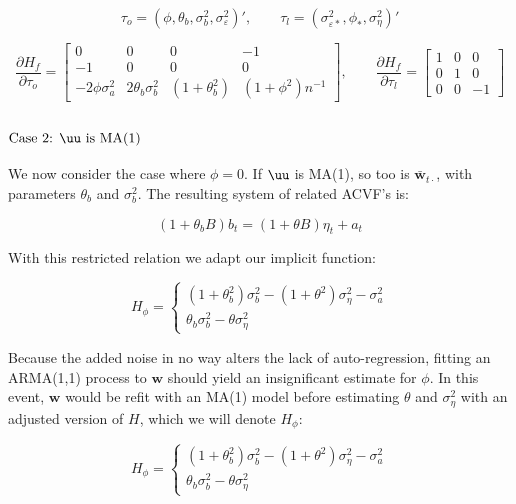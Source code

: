 $$ \tau_o = (\phi,\theta_b,\sigma_b^2, \sigma_\varepsilon^2)', \qquad \tau_l = (\sigma_{\varepsilon*}^2, \phi_*, \sigma_\eta^2)' $$

$$ \frac{\partial H_f}{\partial \tau_o} = \left[\begin{array}{cccc}
    0 & 0 & 0 & -1 \\
    -1 & 0 & 0 & 0 \\
    -2\phi\sigma_a^2 & 2\theta_b\sigma_b^2 & (1 + \theta_b^2) & (1 + \phi^2)n^{-1}
\end{array}\right], \qquad \frac{\partial H_f}{\partial \tau_l} = \left[\begin{array}{ccc}
    1 & 0 & 0  \\
    0 & 1 & 0 \\
    0 & 0 & -1
\end{array}\right] $$

\subsubsection{$\text{Case 2: } \uu \text{ is MA(1)}$}
We now consider the case where $\phi = 0$. If $\uu$ is MA(1), so too is $\bar{\mathbf{w}}_{t\cdot}$, with parameters $\theta_b$ and $\sigma_b^2$. The resulting system of related ACVF's is: 

$$ (1 + \theta_bB)b_t = (1 + \theta B)\eta_t + a_t $$

With this restricted relation we adapt our implicit function:

$$H_\phi = \begin{cases}
    (1 + \theta_b^2)\sigma_b^2 - (1 + \theta^2)\sigma_\eta^2 - \sigma_a^2 \\
    \theta_b\sigma_b^2 - \theta\sigma_\eta^2
\end{cases}$$

Because the added noise in no way alters the lack of auto-regression, fitting an ARMA(1,1) process to $\mathbf{w}$ should yield an insignificant estimate for $\phi$. In this event, $\mathbf{w}$ would be refit with an MA(1) model before estimating $\theta$ and $\sigma_\eta^2$ with an adjusted version of $H$, which we will denote $H_\phi$:

\begin{equation}
    \label{eq:H_phi}
    H_{\phi} = \begin{cases}
        (1 + \theta_b^2)\sigma_b^2 - (1 + \theta^2)\sigma_\eta^2 - \sigma_a^2 \\
        \theta_b\sigma_b^2 - \theta\sigma_\eta^2
    \end{cases} 
\end{equation}


